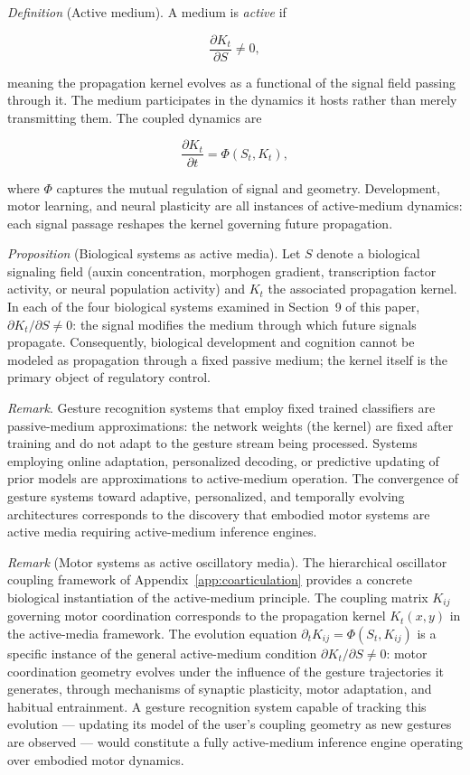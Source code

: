 \documentclass[11pt, a4paper]{article}
\theoremstyle{definition}
\begin{document}
\textit{Definition} (Active medium). A medium is \emph{active} if

\[
\frac{\partial K_t}{\partial S} \neq 0,
\]

meaning the propagation kernel evolves as a functional of the signal field passing through it. The medium participates in the dynamics it hosts rather than merely transmitting them. The coupled dynamics are

\[
\frac{\partial K_t}{\partial t} = \Phi(S_t, K_t),
\]

where $\Phi$ captures the mutual regulation of signal and geometry. Development, motor learning, and neural plasticity are all instances of active-medium dynamics: each signal passage reshapes the kernel governing future propagation.

\textit{Proposition} (Biological systems as active media). Let $S$ denote a biological signaling field (auxin concentration, morphogen gradient, transcription factor activity, or neural population activity) and $K_t$ the associated propagation kernel. In each of the four biological systems examined in Section~9 of this paper, $\partial K_t / \partial S \neq 0$: the signal modifies the medium through which future signals propagate. Consequently, biological development and cognition cannot be modeled as propagation through a fixed passive medium; the kernel itself is the primary object of regulatory control.

\textit{Remark}. Gesture recognition systems that employ fixed trained classifiers are passive-medium approximations: the network weights (the kernel) are fixed after training and do not adapt to the gesture stream being processed. Systems employing online adaptation, personalized decoding, or predictive updating of prior models are approximations to active-medium operation. The convergence of gesture systems toward adaptive, personalized, and temporally evolving architectures corresponds to the discovery that embodied motor systems are active media requiring active-medium inference engines.

\textit{Remark} (Motor systems as active oscillatory media). The hierarchical oscillator coupling framework of Appendix~\ref{app:coarticulation} provides a concrete biological instantiation of the active-medium principle. The coupling matrix $K_{ij}$ governing motor coordination corresponds to the propagation kernel $K_t(x,y)$ in the active-media framework. The evolution equation $\partial_t K_{ij} = \Phi(S_t, K_{ij})$ is a specific instance of the general active-medium condition $\partial K_t / \partial S \neq 0$: motor coordination geometry evolves under the influence of the gesture trajectories it generates, through mechanisms of synaptic plasticity, motor adaptation, and habitual entrainment. A gesture recognition system capable of tracking this evolution --- updating its model of the user's coupling geometry as new gestures are observed --- would constitute a fully active-medium inference engine operating over embodied motor dynamics.
\end{document}
